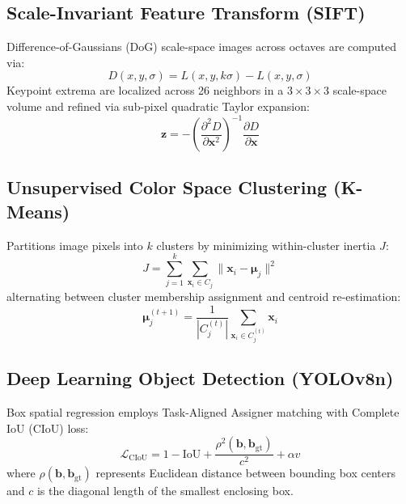 \documentclass[12pt,a4paper]{article}
\begin{document}
\subsection{Scale-Invariant Feature Transform (SIFT)}
Difference-of-Gaussians (DoG) scale-space images across octaves are computed via:
\begin{equation}
D(x, y, \sigma) = L(x, y, k\sigma) - L(x, y, \sigma)
\end{equation}
Keypoint extrema are localized across 26 neighbors in a $3 \times 3 \times 3$ scale-space volume and refined via sub-pixel quadratic Taylor expansion:
\begin{equation}
\mathbf{z} = -\left(\frac{\partial^2 D}{\partial \mathbf{x}^2}\right)^{-1} \frac{\partial D}{\partial \mathbf{x}}
\end{equation}

\subsection{Unsupervised Color Space Clustering (K-Means)}
Partitions image pixels into $k$ clusters by minimizing within-cluster inertia $J$:
\begin{equation}
J = \sum_{j=1}^{k} \sum_{\mathbf{x}_i \in C_j} \|\mathbf{x}_i - \boldsymbol{\mu}_j\|^2
\end{equation}
alternating between cluster membership assignment and centroid re-estimation:
\begin{equation}
\boldsymbol{\mu}_j^{(t+1)} = \frac{1}{|C_j^{(t)}|} \sum_{\mathbf{x}_i \in C_j^{(t)}} \mathbf{x}_i
\end{equation}

\subsection{Deep Learning Object Detection (YOLOv8n)}
Box spatial regression employs Task-Aligned Assigner matching with Complete IoU (CIoU) loss:
\begin{equation}
\mathcal{L}_{\text{CIoU}} = 1 - \text{IoU} + \frac{\rho^2(\mathbf{b}, \mathbf{b}_{\text{gt}})}{c^2} + \alpha v
\end{equation}
where $\rho(\mathbf{b}, \mathbf{b}_{\text{gt}})$ represents Euclidean distance between bounding box centers and $c$ is the diagonal length of the smallest enclosing box.
\end{document}
